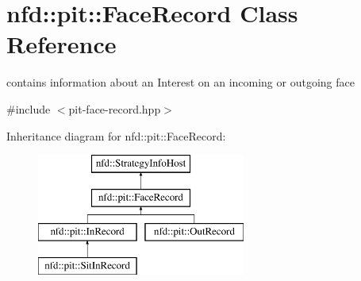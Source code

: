 \hypertarget{classnfd_1_1pit_1_1FaceRecord}{}\section{nfd\+:\+:pit\+:\+:Face\+Record Class Reference}
\label{classnfd_1_1pit_1_1FaceRecord}


contains information about an Interest on an incoming or outgoing face  




{\ttfamily \#include $<$pit-\/face-\/record.\+hpp$>$}

Inheritance diagram for nfd\+:\+:pit\+:\+:Face\+Record\+:\begin{figure}[H]
\begin{center}
\leavevmode
\includegraphics[height=4.000000cm]{classnfd_1_1pit_1_1FaceRecord}
\end{center}
\end{figure}
